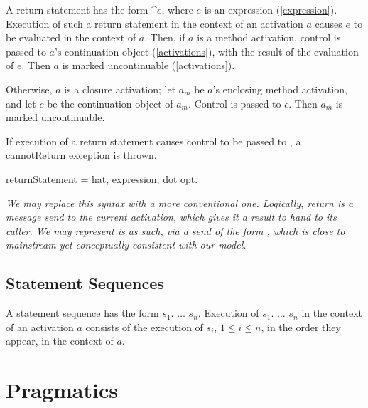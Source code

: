 \documentclass{article}
\newcommand{\code}[1]{{\sf #1}}
\begin{document}
A return statement has the form \^{}$e$, where $e$ is an expression (\ref{expression}). Execution of such a return statement in the context of an activation $a$ causes $e$ to be evaluated in the context of $a$.   Then, if $a$ is a method activation, control is passed to $a$'s continuation object (\ref{activations}), with the result of the evaluation of $e$. Then $a$ is marked uncontinuable (\ref{activations}).

Otherwise, $a$ is a closure activation; let $a_m$ be $a$'s enclosing method activation, and let $c$ be the continuation object of $a_m$.
Control is passed to $c$. Then $a_m$ is marked uncontinuable.

If execution of a return statement causes control to be passed to \NIL{}, a \code{cannotReturn} exception is thrown.

\begin{newspeak}
 returnStatement = hat,  expression, dot opt.
\end{newspeak}

{\it
We may replace this syntax with a more conventional one. Logically, return is a message send to the current activation, which gives it a result to hand to its caller. We may represent is as such, via a send of the form , which is close to mainstream yet conceptually consistent with our model.
}


\subsection{Statement Sequences}
\label{stmtSeq}

A statement sequence has the form $s_1.$ $\ldots$ $ s_n$. Execution of  $s_1.$ $\ldots$ $ s_n$ in the context of an activation $a$  consists of the execution of $s_i$,  $1 \le i \le n$, in the order they appear,  in the context of $a$. 

\section{Pragmatics}
\end{document}
